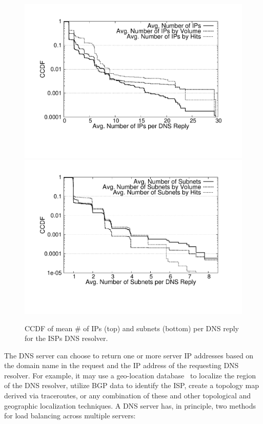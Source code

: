 \begin{figure}[htbp]
   \center
   \includegraphics[height=0.7\linewidth]{figures-pdf/avgResponseSize}\\
   \includegraphics[height=0.7\linewidth]{figures-pdf/avgResponseSubnetSize}

  \caption{CCDF of mean \# of IPs (top) and subnets (bottom) per DNS reply for the ISPs DNS resolver.}
  \label{fig:CDF-AVG-REPLY-IPs}
\end{figure}

The DNS server can choose to return one or more server IP addresses based on
the domain name in the request and the IP address of the requesting DNS
resolver. For example, it may use a geo-location database~\cite{MaxMind} to
localize the region of the DNS resolver, utilize BGP data to identify the ISP,
create a topology map derived via traceroutes, or any combination of these and
other topological and geographic localization techniques. A DNS server has, in
principle, two methods for load balancing across multiple servers:

